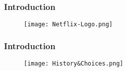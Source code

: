 \begin{frame}

    \frametitle{Introduction}

    \begin{figure}
        \centering
        \texttt{[image: Netflix-Logo.png]}
    \end{figure}

\end{frame}



\begin{frame}

    \frametitle{Introduction}

    \begin{figure}
        \centering
        \texttt{[image: History\&Choices.png]}
    \end{figure}

\end{frame}